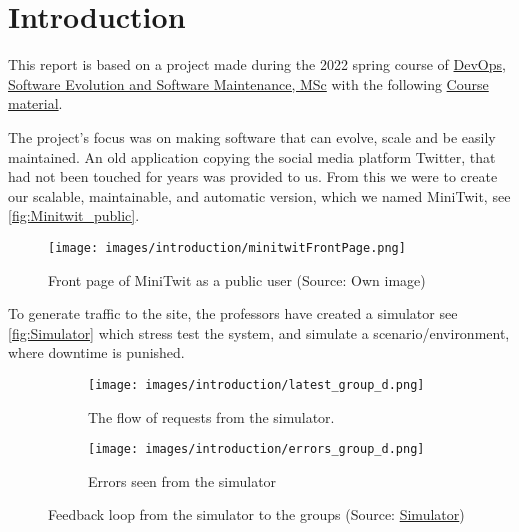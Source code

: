 \section{Introduction}
This report is based on a project made during the 2022 spring course of \href{https://learnit.itu.dk/local/coursebase/view.php?ciid=909}{DevOps, Software Evolution and Software Maintenance, MSc} with the following  \href{https://github.com/itu-devops/lecture_notes/tree/e44664f50c8b0ffb30a77a29e305df3f6750d5d4}{Course material}. 

The project's focus was on making software that can evolve, scale and be easily maintained. An old application copying the social media platform Twitter, that had not been touched for years was provided to us. From this we were to create our scalable, maintainable, and automatic version, which we named MiniTwit, see \autoref{fig:Minitwit_public}.

\begin{figure}[!ht]
    \centering
    \captionsetup{justification=centering,margin=1cm}
    \texttt{[image: images/introduction/minitwitFrontPage.png]}
    \caption{Front page of MiniTwit as a public user (Source: Own image)}
    \label{fig:Minitwit_public}
\end{figure}

To generate traffic to the site, the professors have created a simulator see \autoref{fig:Simulator} which stress test the system, and simulate a scenario/environment, where downtime is punished. 

\begin{figure}[h!]
  \centering
  \begin{subfigure}[b]{0.45\linewidth}
    \texttt{[image: images/introduction/latest\_group\_d.png]}
    \caption{The flow of requests from the simulator.}
  \end{subfigure}
  \begin{subfigure}[b]{0.45\linewidth}
    \texttt{[image: images/introduction/errors\_group\_d.png]}
    \caption{Errors seen from the simulator}
  \end{subfigure}
  \caption{Feedback loop from the simulator to the groups (Source: \href{http://164.92.246.227/status.html}{Simulator})}
  \label{fig:Simulator}
\end{figure}



  